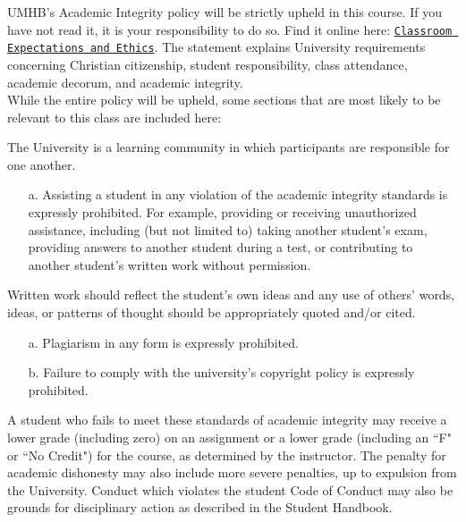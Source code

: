 \documentclass[article]{article}
\begin{document}
UMHB's Academic Integrity policy will be strictly upheld in this course. If you have not read it, it is your responsibility to do so.  Find it online here:  \href{http://catalog.umhb.edu/en/2018-2019/Undergraduate-Catalog/Classroom-Expectations-and-Ethics}{\texttt{Classroom Expectations and Ethics}}.  
The statement explains University requirements concerning Christian citizenship, student responsibility, class attendance, academic decorum, and academic integrity.\\
 
While the entire policy will be upheld, some sections that are most likely to be relevant to this class are included here:
 
The University is a learning community in which participants are responsible for one another.
\begin{itemize}
\item[a.] Assisting a student in any violation of the academic integrity standards is expressly prohibited. For example, providing or receiving unauthorized assistance, including (but not limited to) taking another student's exam, providing answers to another student during a test, or contributing to another student's written work without permission.
\end{itemize}
 
Written work should reflect the student's own ideas and any use of others' words, ideas, or patterns of thought should be appropriately quoted and/or cited.
\begin{itemize}
\item[a.] Plagiarism in any form is expressly prohibited.
\item[b.] Failure to comply with the university's copyright policy is expressly prohibited.
\end{itemize}
 
A student who fails to meet these standards of academic integrity may receive a lower grade (including zero) on an assignment or a lower grade (including an ``F" or ``No Credit") for the course, as determined by the instructor. The penalty for academic dishonesty may also include more severe penalties, up to expulsion from the University. Conduct which violates the student Code of Conduct may also be grounds for disciplinary action as described in the Student Handbook.
\end{document}
